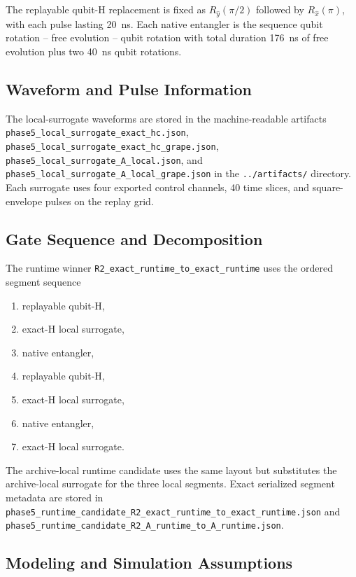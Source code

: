 \documentclass[aps,pra,twocolumn,reprint,amsmath,amssymb]{revtex4-2}
\begin{document}
The replayable qubit-H replacement is fixed as
$R_{\hat y}(\pi/2)$ followed by $R_{\hat x}(\pi)$, with each pulse lasting
\SI{20}{ns}. Each native entangler is the sequence
qubit rotation -- free evolution -- qubit rotation with total duration
\SI{176}{ns} of free evolution plus two \SI{40}{ns} qubit rotations.

\subsection{Waveform and Pulse Information}

The local-surrogate waveforms are stored in the machine-readable artifacts
\texttt{phase5\_local\_surrogate\_exact\_hc.json},
\texttt{phase5\_local\_surrogate\_exact\_hc\_grape.json},
\texttt{phase5\_local\_surrogate\_A\_local.json}, and
\texttt{phase5\_local\_surrogate\_A\_local\_grape.json} in the
\texttt{../artifacts/} directory. Each surrogate uses four exported control
channels, 40 time slices, and square-envelope pulses on the replay grid.

\subsection{Gate Sequence and Decomposition}

The runtime winner \texttt{R2\_exact\_runtime\_to\_exact\_runtime} uses the
ordered segment sequence
\begin{enumerate}
  \item replayable qubit-H,
  \item exact-H local surrogate,
  \item native entangler,
  \item replayable qubit-H,
  \item exact-H local surrogate,
  \item native entangler,
  \item exact-H local surrogate.
\end{enumerate}
The archive-local runtime candidate uses the same layout but substitutes the
archive-local surrogate for the three local segments. Exact serialized segment
metadata are stored in
\texttt{phase5\_runtime\_candidate\_R2\_exact\_runtime\_to\_exact\_runtime.json}
and
\texttt{phase5\_runtime\_candidate\_R2\_A\_runtime\_to\_A\_runtime.json}.

\subsection{Modeling and Simulation Assumptions}
\end{document}
